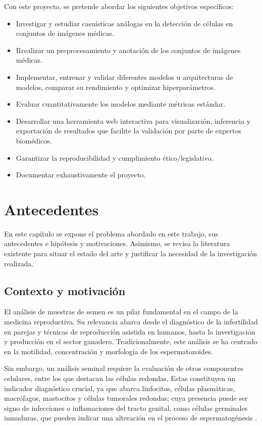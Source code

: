 \documentclass[12pt,a4paper,onecolumn,oneside]{report}
\begin{document}
Con este proyecto, se pretende abordar los siguientes objetivos específicos: 

\begin{itemize}
  \item Investigar y estudiar casuísticas análogas en la detección de células en conjuntos de imágenes médicas.
  \item Rrealizar un preprocesamiento y anotación de los conjuntos de imágenes médicas.
  \item Implementar, entrenar y validar diferentes modelos u arquitecturas de modelos, comparar su rendimiento y optimizar hiperparámetros.
  \item Evaluar cuantitativamente los modelos mediante métricas estándar.
  \item Desarrollar una herramienta web interactiva para visualización, inferencia y exportación de resultados que facilite la validación por parte de expertos biomédicos.
  \item Garantizar la reproducibilidad y cumplimiento ético/legislativo.
  \item Documentar exhaustivamente el proyecto.
\end{itemize}


\chapter{Antecedentes} %
\label{Antecedentes}

En este capítulo se expone el problema abordado en este trabajo, sus antecedentes e hipótesis y motivaciones. 
Asimismo, se revisa la literatura existente para situar el estado del arte y justificar la necesidad de la investigación realizada.

\section{Contexto y motivación}
\label{sec:Contexto y motivación}

El análisis de muestras de semen es un pilar fundamental en el campo de la medicina reproductiva. Su relevancia abarca desde el diagnóstico 
de la infertilidad en parejas y técnicas de reproducción asistida en humanos, hasta la investigación y producción en el sector ganadero. Tradicionalmente,
este análisis se ha centrado en la motilidad, concentración y morfología de los espermatozoides.

Sin embargo, un análisis seminal requiere la evaluación de otros componentes celulares, entre los que destacan las células redondas. 
Estas constituyen un indicador diagnóstico crucial, ya que abarca linfocitos, células plasmáticas, macrófagos, mastocitos y células tumorales redondas; cuya presencia puede ser signo de infecciones o inflamaciones 
del tracto genital, como células germinales inmaduras, que pueden indicar una alteración en el proceso de espermatogénesis \cite{HamiltonThorneRoundCells}.
\end{document}
